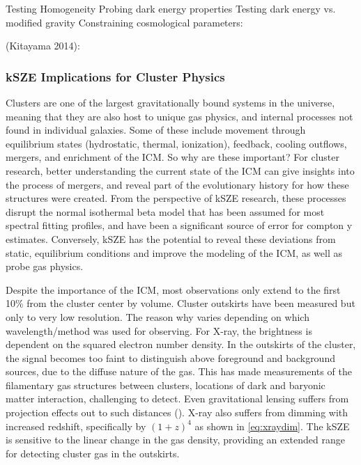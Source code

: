 \documentclass[manuscript]{aastex}
\begin{document}

Testing Homogeneity
Probing dark energy properties
Testing dark energy vs. modified gravity
 Constraining cosmological parameters:

(Kitayama 2014):
	
\subsubsection{kSZE Implications for Cluster Physics}

Clusters are one of the largest gravitationally bound systems in the universe, meaning that they are also host to unique gas physics, and internal processes not found in individual galaxies. Some of these include movement through equilibrium states (hydrostatic, thermal, ionization), feedback, cooling outflows, mergers, and enrichment of the ICM. So why are these important? For cluster research, better understanding the current state of the ICM can give insights into the process of mergers, and reveal part of the evolutionary history for how these structures were created. From the perspective of kSZE research, these processes disrupt the normal isothermal beta model that has been assumed for most spectral fitting profiles, and have been a significant source of error for compton y estimates. Conversely, kSZE has the potential to reveal these deviations from static, equilibrium conditions and improve the modeling of the ICM, as well as probe gas physics. 

Despite the importance of the ICM, most observations only extend to the first 10\% from the cluster center by volume. Cluster outskirts have been measured but only to very low resolution. The reason why varies depending on which wavelength/method was used for observing. For X-ray, the brightness is dependent on the squared electron number density. In the outskirts of the cluster, the signal becomes too faint to distinguish above foreground and background sources, due to the diffuse nature of the gas.  This has made measurements of the filamentary gas structures between clusters, locations of dark and baryonic matter interaction, challenging to detect. Even gravitational lensing suffers from projection effects out to such distances (\cite{Reiprich2013}). X-ray also suffers from dimming with increased redshift, specifically by \((1+z)^{4}\) as shown in \ref{eq:xraydim}. The kSZE is sensitive to the linear change in the gas density, providing an extended range for detecting cluster gas in the outskirts. 
\end{document}
